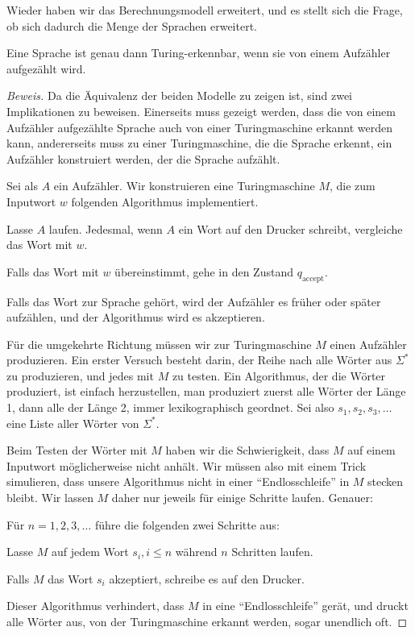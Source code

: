 Wieder haben wir das Berechnungsmodell erweitert, und es stellt sich
die Frage, ob sich dadurch die Menge der Sprachen erweitert.

\begin{satz}
Eine Sprache ist genau dann Turing-erkennbar, wenn sie
von einem Aufzähler aufgezählt wird.\end{satz}

\begin{proof}[Beweis]
Da die Äquivalenz der beiden Modelle zu zeigen ist, sind zwei Implikationen
zu beweisen. Einerseits muss gezeigt werden, dass die von einem
Aufzähler aufgezählte Sprache auch von einer Turingmaschine
erkannt werden kann, andererseits muss zu einer Turingmaschine, die
die Sprache erkennt, ein Aufzähler konstruiert werden, der die Sprache
aufzählt.

Sei als $A$ ein Aufzähler. Wir konstruieren eine Turingmaschine $M$, die
zum Inputwort $w$ folgenden Algorithmus implementiert.
\begin{compactenum}
\item Lasse $A$ laufen. Jedesmal, wenn $A$ ein Wort auf den Drucker schreibt,
vergleiche das Wort mit $w$.
\item Falls das Wort mit $w$ übereinstimmt, gehe in den Zustand
$q_{\text{accept}}$.
\end{compactenum}
Falls das Wort zur Sprache gehört, wird der Aufzähler es früher
oder später aufzählen, und der Algorithmus wird es akzeptieren.

Für die umgekehrte Richtung müssen wir zur Turingmaschine $M$
einen Aufzähler produzieren.
Ein erster Versuch besteht darin, der Reihe nach alle Wörter aus
$\Sigma^*$ zu produzieren, und jedes mit $M$ zu testen.
Ein Algorithmus, der die Wörter produziert, ist einfach herzustellen,
man produziert zuerst alle Wörter der Länge 1, dann alle der Länge 2,
immer lexikographisch geordnet.
Sei also $s_1,s_2,s_3,\dots$ eine Liste aller Wörter von $\Sigma^*$.

Beim Testen der Wörter mit $M$
haben wir die Schwierigkeit, dass $M$ auf einem Inputwort
möglicherweise nicht anhält. Wir müssen also mit einem Trick
simulieren, dass unsere Algorithmus nicht in einer ``Endlosschleife''
in $M$ stecken bleibt. Wir lassen $M$ daher nur jeweils für einige
Schritte laufen.
Genauer:
\begin{compactenum}
\item Für $n=1,2,3,\dots$ führe die folgenden zwei Schritte aus:
\item Lasse $M$ auf jedem Wort $s_i, i \le n$ während $n$ Schritten
laufen.
\item Falls $M$ das Wort $s_i$ akzeptiert, schreibe es auf den Drucker.
\end{compactenum}
Dieser Algorithmus verhindert, dass $M$ in eine ``Endlosschleife''
gerät, und druckt alle Wörter aus, von der Turingmaschine erkannt
werden, sogar unendlich oft.
\end{proof}

